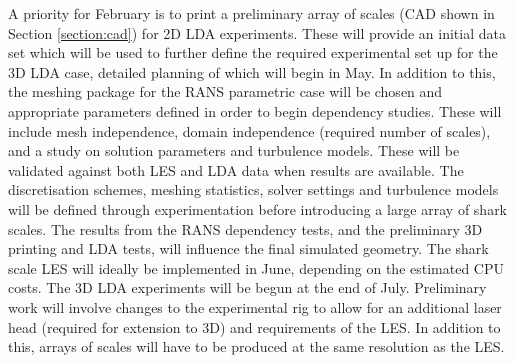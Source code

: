 \documentclass[12pt,oneside,a4paper]{article}
\begin{document}
A priority for February is to print a preliminary array of scales (CAD shown in Section \ref{section:cad}) for 2D LDA experiments. These will provide an initial data set which will be used to further define the required experimental set up for the 3D LDA case, detailed planning of which will begin in May. In addition to this, the meshing package for the RANS parametric case will be chosen and appropriate parameters defined in order to begin dependency studies. These will include mesh independence, domain independence (required number of scales), and a study on solution parameters and turbulence models. These will be validated against both LES and LDA data when results are available. The discretisation schemes, meshing statistics, solver settings and turbulence models will be defined through experimentation before introducing a large array of shark scales. The results from the RANS dependency tests, and the preliminary 3D printing and LDA tests, will influence the final simulated geometry. The shark scale LES will ideally  be implemented in June, depending on the estimated CPU costs.  The 3D LDA experiments will be begun at the end of July. Preliminary work will involve changes to the experimental rig to allow for an additional laser head (required for extension to 3D) and requirements of the LES. In addition to this, arrays of scales will have to be produced at the same resolution as the LES.
\end{document}
